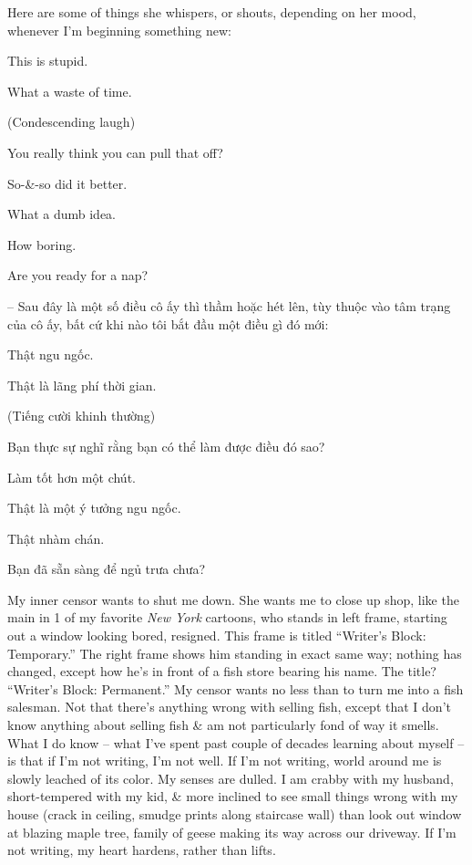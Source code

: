 \documentclass{article}
\begin{document}
\begin{itemize}
	Here are some of things she whispers, or shouts, depending on her mood, whenever I'm beginning something new:
	
	This is stupid.
	
	What a waste of time.
	
	(Condescending laugh)
	
	You really think you can pull that off?
	
	So-\&-so did it better.
	
	What a dumb idea.
	
	How boring.
	
	Are you ready for a nap?
	
	-- Sau đây là một số điều cô ấy thì thầm hoặc hét lên, tùy thuộc vào tâm trạng của cô ấy, bất cứ khi nào tôi bắt đầu một điều gì đó mới:
	
	Thật ngu ngốc.
	
	Thật là lãng phí thời gian.
	
	(Tiếng cười khinh thường)
	
	Bạn thực sự nghĩ rằng bạn có thể làm được điều đó sao?
	
	Làm tốt hơn một chút.
	
	Thật là một ý tưởng ngu ngốc.
	
	Thật nhàm chán.
	
	Bạn đã sẵn sàng để ngủ trưa chưa?
	
	My inner censor wants to shut me down. She wants me to close up shop, like the main in 1 of my favorite {\it New York} cartoons, who stands in left frame, starting out a window looking bored, resigned. This frame is titled ``Writer's Block: Temporary.'' The right frame shows him standing in exact same way; nothing has changed, except how he's in front of a fish store bearing his name. The title? ``Writer's Block: Permanent.'' My censor wants no less than to turn me into a fish salesman. Not that there's anything wrong with selling fish, except that I don't know anything about selling fish \& am not particularly fond of way it smells. What I do know -- what I've spent past couple of decades learning about myself -- is that if I'm not writing, I'm not well. If I'm not writing, world around me is slowly leached of its color. My senses are dulled. I am crabby with my husband, short-tempered with my kid, \& more inclined to see small things wrong with my house (crack in ceiling, smudge prints along staircase wall) than look out window at blazing maple tree, family of geese making its way across our driveway. If I'm not writing, my heart hardens, rather than lifts.
	

\end{itemize}
\end{document}
